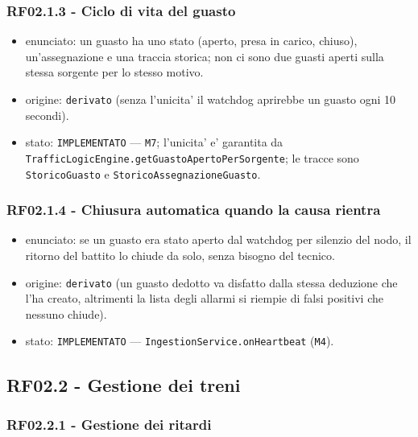 \documentclass[11pt]{article}
\begin{document}
\subsubsection{RF02.1.3 - Ciclo di vita del guasto}
\label{sec:org21d16f5}
\begin{itemize}
\item enunciato: un guasto ha uno stato (aperto, presa in carico, chiuso), un'assegnazione e una traccia
storica; non ci sono due guasti aperti sulla stessa sorgente per lo stesso motivo.
\item origine: \texttt{derivato} (senza l'unicita' il watchdog aprirebbe un guasto ogni 10 secondi).
\item stato: \texttt{IMPLEMENTATO} — \texttt{M7}; l'unicita' e' garantita da
\texttt{TrafficLogicEngine.getGuastoApertoPerSorgente}; le tracce sono \texttt{StoricoGuasto} e
\texttt{StoricoAssegnazioneGuasto}.
\end{itemize}
\subsubsection{RF02.1.4 - Chiusura automatica quando la causa rientra}
\label{sec:orgfa31e88}
\begin{itemize}
\item enunciato: se un guasto era stato aperto dal watchdog per silenzio del nodo, il ritorno del
battito lo chiude da solo, senza bisogno del tecnico.
\item origine: \texttt{derivato} (un guasto dedotto va disfatto dalla stessa deduzione che l'ha creato,
altrimenti la lista degli allarmi si riempie di falsi positivi che nessuno chiude).
\item stato: \texttt{IMPLEMENTATO} — \texttt{IngestionService.onHeartbeat} (\texttt{M4}).
\end{itemize}
\subsection{RF02.2 - Gestione dei treni}
\label{sec:org44158c3}

\subsubsection{RF02.2.1 - Gestione dei ritardi}
\label{sec:org38d8621}
\end{document}
